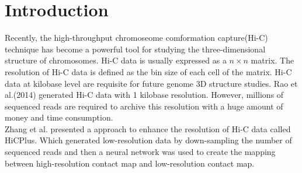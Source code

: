 \section{Introduction}
Recently, the high-throughput chromoseome comformation capture(Hi-C) technique has become a powerful tool for studying the three-dimensional structure of chromosomes. Hi-C data is usually expressed as a $n \times n$ matrix. The resolution of Hi-C data is defined as the bin size of each cell of the matrix. Hi-C data at kilobase level are requisite for future genome 3D structure studies. Rao et al.(2014) generated Hi-C data with 1 kilobase resolution. However, millions of sequenced reads are required to archive this resolution with a huge amount of money and time consumption.\\
Zhang et al. presented a approach to enhance the resolution of Hi-C data called HiCPlus. Which generated low-resolution data by down-sampling the number of sequenced reads and then a neural network was used to create the mapping between high-resolution contact map and low-resolution contact map. 